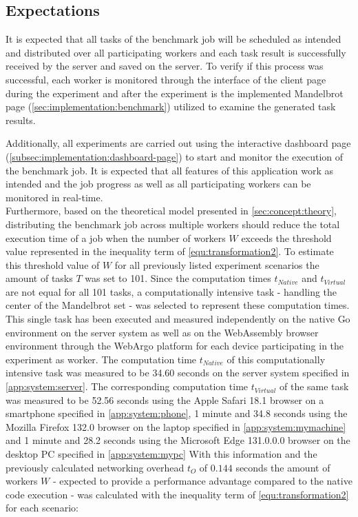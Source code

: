 \subsection{Expectations}
It is expected that all tasks of the benchmark job will be scheduled as intended and distributed over all participating workers and each task result is successfully received by the server and saved on the server. To verify if this process was successful, each worker is monitored through the interface of the client page during the experiment and after the experiment is the implemented Mandelbrot page (\autoref{sec:implementation:benchmark}) utilized to examine the generated task results.

Additionally, all experiments are carried out using the interactive dashboard page (\autoref{subsec:implementation:dashboard-page}) to start and monitor the execution of the benchmark job. It is expected that all features of this application work as intended and the job progress as well as all participating workers can be monitored in real-time.
~\\
Furthermore, based on the theoretical model presented in \autoref{sec:concept:theory}, distributing the benchmark job across multiple workers should reduce the total execution time of a job when the number of workers $W$ exceeds the threshold value represented in the inequality term of \eqref{equ:transformation2}. To estimate this threshold value of $W$ for all previously listed experiment scenarios the amount of tasks $T$ was set to 101. Since the computation times $t_{Native}$ and $t_{Virtual}$ are not equal for all 101 tasks, a computationally intensive task - handling the center of the Mandelbrot set - was selected to represent these computation times. This single task has been executed and measured independently on the native Go environment on the server system as well as on the WebAssembly browser environment through the WebArgo platform for each device participating in the experiment as worker. The computation time $t_{Native}$ of this computationally intensive task was measured to be 34.60 seconds on the server system specified in \autoref{app:system:server}. The corresponding computation time $t_{Virtual}$ of the same task was measured to be 52.56 seconds using the Apple Safari 18.1 \cite{evaluation:safari} browser on a smartphone specified in \autoref{app:system:phone}, 1 minute and 34.8 seconds using the Mozilla Firefox 132.0 \cite{background:firefox} browser on the laptop specified in \autoref{app:system:mymachine} and 1 minute and 28.2 seconds using the Microsoft Edge 131.0.0.0 \cite{evaluation:edge} browser on the desktop \ac{PC} specified in \autoref{app:system:mypc} With this information and the previously calculated networking overhead $t_{O}$ of $0.144$ seconds the amount of workers $W$ - expected to provide a performance advantage compared to the native code execution - was calculated with the inequality term of \eqref{equ:transformation2} for each scenario:
